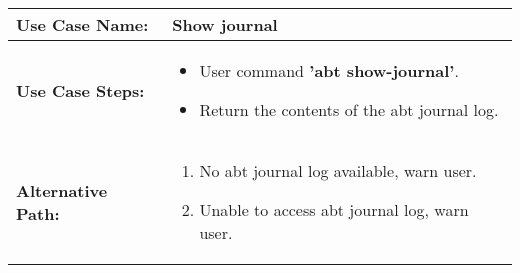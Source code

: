 \medskip

\begin{tabularx}{\linewidth}{|l|X|}
\hline
\textbf{Use Case Name:} & \textbf{Show journal} \\
\hline
\textbf{Use Case Steps:} & 
\begin{minipage}{\linewidth} 
  \vspace{0.05em}
  \begin{itemize}
    \item User command \textbf{'abt show-journal'}.
    \item Return the contents of the abt journal log.
  \end{itemize}
  \vspace{0.05em}
\end{minipage}
\\
\hline 
\textbf{Alternative Path:} &
\begin{minipage}{\linewidth}
  \vspace{0.05em} 
  \begin{enumerate}
    \item No abt journal log available, warn user.
    \item Unable to access abt journal log, warn user.
  \end{enumerate}
  \vspace{0.05em} 
\end{minipage}
\\
\hline
\end{tabularx}